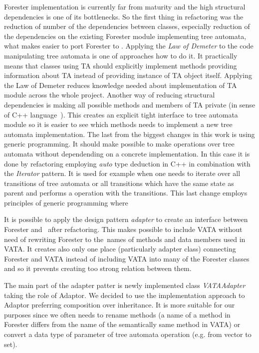 \documentclass[fleqn,11pt]{ExcelAtFIT} %
\begin{document}
Forester implementation is currently far from maturity and
the high structural dependencies is one of its bottlenecks.
So the first thing in refactoring was the reduction of number of the dependencies between classes,
especially reduction of the dependencies on the existing Forester module implementing tree automata,
what makes easier to port Forester to \vata.
Applying the \emph{Law of Demeter} \cite{lod89} to the code manipulating tree automata is one of approaches how to do it. 
It practically means that classes using TA should explicitly implement methods providing information about TA instead of providing instance of TA object itself.
Applying the Law of Demeter reduces knowledge needed about implementation of TA module across the whole project.
Another way of reducing structural dependencies is making all possible methods and members of TA private (in sense of C++ language~\cite{stroustrup13}).
This creates an explicit tight interface to tree automata module so it is easier to see which methods needs to implement
a new tree automata implementation.
The last from the biggest changes in this work is using generic programming.
It should make possible to make operations over tree automata without dependending on a concrete implementation.
In this case it is done by refactoring employing \emph{auto} type deduction in C++ in combination
with the \emph{Iterator} pattern.
It is used for example when one needs to iterate over all transitions of tree automata or all transitions which
have the same state as parent and performs a operation with the transitions.
This last change employs principles of generic programming where

It is possible to apply the design pattern \emph{adapter} \cite{gamma95} to create
an interface between Forester and \vata\ after refactoring.
This makes possible to include VATA without need of rewriting
Forester to the~names of methods and data members used in VATA.
It creates also only one place (particularly adapter class) connecting Forester and VATA instead of
including VATA into many of the Forester classes and so it prevents creating too strong relation between them.

The main part of the adapter patter is newly implemented class \emph{VATAAdapter} taking the role of Adaptor.
We decided to use the implementation approach to Adaptor preferring composition over inheritance.
It is more suitable for our purposes since we often needs to rename methods 
(a name of a method in Forester differs from the name of the semantically same method in VATA)
or convert a data type of parameter of tree automata operation (e.g. from vector to set). 
\end{document}
